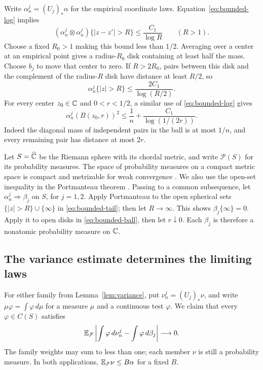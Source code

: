 Write $\alpha_n^j=(U_j)_*\alpha$ for the empirical coordinate laws.
Equation~\eqref{eq:bounded-log} implies
\[
 (\alpha_n^j\otimes\alpha_n^j)\{|z-z'|>R\}
 \le \frac{C_1}{\log R}\qquad(R>1).
\]
Choose a fixed $R_0>1$ making this bound less than $1/2$.
Averaging over a center at an empirical point gives a radius-$R_0$
disk containing at least half the mass.  Choose $b_j$ to move that
center to zero.  If $R>2R_0$, pairs between this disk and the complement
of the radius-$R$ disk have distance at least $R/2$, so
\begin{equation}\label{eq:bounded-tail}
 \alpha_n^j\{|z|>R\}\le \frac{2C_1}{\log(R/2)}.
\end{equation}
For every center $z_0\in\mathbb C$ and $0<r<1/2$, a similar use of
\eqref{eq:bounded-log} gives
\begin{equation}\label{eq:bounded-ball}
 \alpha_n^j(B(z_0,r))^2
 \le \frac1n+\frac{C_1}{\log(1/(2r))}.
\end{equation}
Indeed the diagonal mass of independent pairs in the ball is at most
$1/n$, and every remaining pair has distance at most $2r$.

Let $S=\widehat{\mathbb C}$ be the Riemann sphere with its chordal metric,
and write $\mathcal P(S)$ for its probability measures.
The space of probability measures on a compact metric space is compact
and metrizable for weak convergence
\cite[Proposition~5.3 and Theorem~4.2]{WeakCompactness}.
We also use the open-set inequality in the Portmanteau theorem
\cite[Theorem~3.2]{WeakCompactness}. Passing to a common subsequence, let
$\alpha_n^j\Rightarrow\beta_j$ on $S$, for $j=1,2$.
Apply Portmanteau to the open spherical sets
$\{|z|>R\}\cup\{\infty\}$ in \eqref{eq:bounded-tail}; then let
$R\to\infty$.  This shows $\beta_j\{\infty\}=0$.
Apply it to open disks in \eqref{eq:bounded-ball}, then let $r\downarrow0$.
Each $\beta_j$ is therefore a nonatomic probability measure on $\mathbb C$.

\subsection{The variance estimate determines the limiting laws}

For either family from Lemma~\ref{lem:variance}, put
$\nu_n^j=(U_j)_*\nu$, and write $\mu\varphi=\int\varphi\,d\mu$
for a measure $\mu$ and a continuous test $\varphi$.
We claim that every $\varphi\in C(S)$ satisfies
\begin{equation}\label{eq:test-convergence}
 \mathbb E_{\mathcal F}
 \left|\int\varphi\,d\nu_n^j-\int\varphi\,d\beta_j\right|
 \longrightarrow0.
\end{equation}
The family weights may sum to less than one; each member $\nu$ is
still a probability measure.  In both applications,
$\mathbb E_{\mathcal F}\nu\le B\alpha$ for a fixed $B$.


